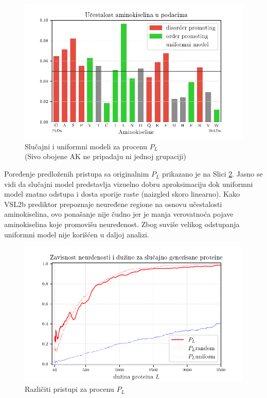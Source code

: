 \begin{figure}[th]
\centering
\includegraphics[]{plots/AK_ucestalost}
\decoRule
\caption{Slučajni i uniformni modeli za procenu $P_L$
\\ \footnotesize(Sivo obojene AK ne pripadaju ni jednoj grupaciji)}
\label{fig:AK_ucestalost}
\end{figure}



Poređenje predloženih pristupa sa originalnim $P_L$ prikazano je na Slici
\ref{fig:PL2}. Jasno se vidi
da slučajni model predstavlja vizuelno dobru aproksimaciju dok uniformni model
znatno odstupa i dosta sporije raste (naizgled skoro linearno). Kako VSL2b
prediktor prepoznaje neuređene regione na osnovu učestalosti aminokiselina, ovo
ponašanje nije čudno jer je manja verovatnoća pojave aminokiselina koje
promovišu neuređenost. Zbog suviše velikog odstupanja uniformni model nije
korišćen u daljoj analizi.


\begin{figure}[th]
\centering
\includegraphics[]{plots/PL_F_cmp}
\decoRule
\caption{Različiti pristupi za procenu $P_L$}
\label{fig:PL2}
\end{figure}


